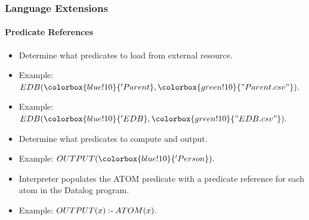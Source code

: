 \documentclass{beamer}
\newcommand{\coloneqtwo}{\mathbin{:\hspace{-0.5ex}\textsf{-}}}
\newcommand{\strconst}[1]{ \colorbox{green!10}{#1} }
\newcommand{\predconst}[1]{ \colorbox{blue!10}{#1} }
\begin{document}
\begin{frame}
\frametitle{Language Extensions}
\framesubtitle{Predicate References}
\begin{itemize}
\item<2->Determine what predicates to load from external resource.
\item<3->Example: $EDB(\predconst{'Parent}, \strconst{"Parent.csv"}).$
\item<4->Example: $EDB(\predconst{'EDB}, \strconst{"EDB.csv"}).$
\end{itemize}

\begin{itemize}
\item<6->Determine what predicates to compute and output. 
\item<7->Example: $OUTPUT(\predconst{'Person}). $
\end{itemize}

\begin{itemize}
\item<9->Interpreter populates the ATOM predicate with a predicate reference for each atom in the Datalog program.
\item<10->Example: $OUTPUT(x) \coloneqtwo ATOM(x).$
\end{itemize}
\end{frame}
\end{document}
